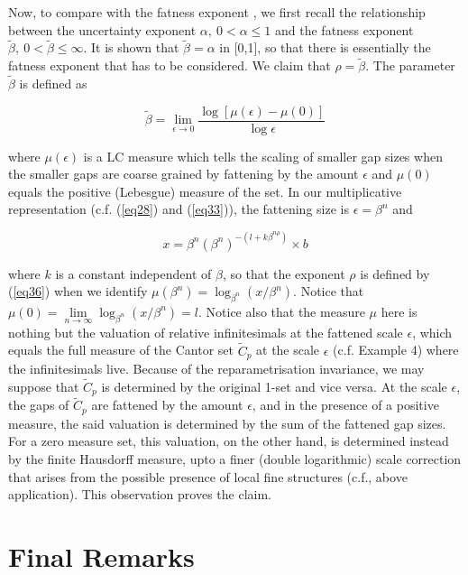 \documentclass[12pt]{article}
\begin{document}
Now, to compare with the fatness exponent \cite{far1, far2}, we first recall the relationship between the uncertainty exponent $\alpha, \ 0<\alpha\leq 1$ \cite{ott} and the fatness exponent $\tilde\beta, \ 0<\tilde \beta\leq \infty$. It is shown \cite{far2} that $\tilde \beta=\alpha$ in [0,1], so that there is essentially the fatness exponent that has to be considered. We claim that $\rho=\tilde\beta$. The parameter $\tilde\beta$ is defined as 

\begin{equation}\label{eq36}
\tilde\beta=\underset{\epsilon\rightarrow 0}{\lim}{\frac{\log [\mu(\epsilon)-\mu(0)]}{\log\epsilon}}
\end{equation}

\noindent where $\mu(\epsilon)$ is a LC measure which tells the scaling of smaller gap sizes when the smaller gaps are coarse grained by fattening by the amount $\epsilon$ and $\mu(0)$ equals the positive (Lebesgue) measure of the set. In our multiplicative representation (c.f. (\ref{eq28}) and (\ref{eq33})), the fattening size is $\epsilon=\beta^n$ and 

\begin{equation}\label{eq37}
x=\beta^{n}\left( \beta ^{n}\right) ^{-(l+k\beta^{n\rho}) }\times b
\end{equation}

\noindent where $k$ is a constant independent of $\beta$, so that the exponent $\rho$ is defined by (\ref{eq36}) when we identify $\mu(\beta^n)=\log_{\beta^{n}} (x/\beta^n)$. Notice that $\mu(0)=\underset{n\rightarrow \infty}{\lim} \log_{\beta^{n}} (x/\beta^n)=l$. Notice also that the measure $\mu$ here is nothing but the valuation of relative infinitesimals at the fattened scale $\epsilon$, which equals the full measure of the Cantor set $\tilde C_p$ at the scale $\epsilon$ (c.f. Example 4) where the infinitesimals live. Because of the reparametrisation invariance, we may  suppose that $\tilde C_p$ is determined by the original 1-set and vice versa. At the scale $\epsilon$, the gaps of $\tilde C_p$ are fattened by  the amount $\epsilon$, and in the presence of a positive measure, the said valuation is determined by the sum of the fattened gap sizes. For a zero measure set, this valuation, on the other hand, is determined instead by the finite Hausdorff measure, upto a finer (double logarithmic) scale  correction that arises from the possible presence of local fine structures (c.f., above application). This observation proves the claim. 

\section{Final Remarks}
\end{document}
